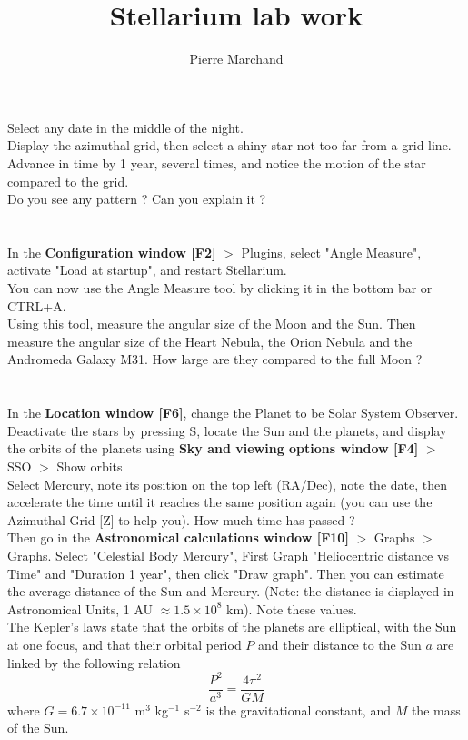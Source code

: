\documentclass{article}
\begin{document}
\title{Stellarium lab work}
\author{Pierre Marchand}
\maketitle

\section{}
Select any date in the middle of the night.\\
Display the azimuthal grid, then select a shiny star not too far from a grid line.\\
Advance in time by 1 year, several times, and notice the motion of the star compared to the grid. \\
Do you see any pattern ? Can you explain it ?


\section{}

In the \textbf{Configuration window [F2]} $>$ Plugins, select "Angle Measure", activate "Load at startup", and restart Stellarium.\\
You can now use the Angle Measure tool by clicking it in the bottom bar or CTRL+A.\\
Using this tool, measure the angular size of the Moon and the Sun. Then measure the angular size of the Heart Nebula, the Orion Nebula and the Andromeda Galaxy M31. How large are they compared to the full Moon ?


\section{}

In the \textbf{Location window [F6]}, change the Planet to be Solar System Observer. Deactivate the stars by pressing S, locate the Sun and the planets, and display the orbits of the planets using \textbf{Sky and viewing options window [F4]} $>$ SSO $>$ Show orbits\\
Select Mercury, note its position on the top left (RA/Dec), note the date, then accelerate the time until it reaches the same position again (you can use the Azimuthal Grid [Z] to help you). How much time has passed ?\\
Then go in the \textbf{Astronomical calculations window [F10]} $>$ Graphs $>$ Graphs. Select "Celestial Body Mercury", First Graph "Heliocentric distance vs Time" and "Duration 1 year", then click "Draw graph". Then you can estimate the average distance of the Sun and Mercury. (Note: the distance is displayed in Astronomical Units, 1 AU $\approx 1.5 \times 10^{8}$ km). Note these values.\\
The Kepler's laws state that the orbits of the planets are elliptical, with the Sun at one focus, and that their orbital period $P$ and their distance to the Sun $a$ are linked by the following relation 
\begin{equation}
  \frac{P^2}{a^3} = \frac{4\pi^2}{GM}
\end{equation}
where $G=6.7\times 10^{-11}$ m$^3$ kg$^{-1}$ s$^{-2}$ is the gravitational constant, and $M$ the mass of the Sun.
\end{document}
